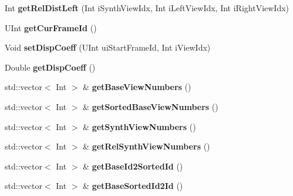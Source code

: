 \begin{DoxyCompactItemize}
\item 
\mbox{\label{class_t_app_com_cam_para_a87cbdc821ef5868ee4a26d709542dd8d}} 
Int {\bfseries get\+Rel\+Dist\+Left} (Int i\+Synth\+View\+Idx, Int i\+Left\+View\+Idx, Int i\+Right\+View\+Idx)
\item 
\mbox{\label{class_t_app_com_cam_para_aac9559fc9c73655d4192c5e58eb53e0a}} 
U\+Int {\bfseries get\+Cur\+Frame\+Id} ()
\item 
\mbox{\label{class_t_app_com_cam_para_a5f01375731e992fedff570a2f5f72142}} 
Void {\bfseries set\+Disp\+Coeff} (U\+Int ui\+Start\+Frame\+Id, Int i\+View\+Idx)
\item 
\mbox{\label{class_t_app_com_cam_para_a63ee097b2c1c12760191fc9ddd0fa855}} 
Double {\bfseries get\+Disp\+Coeff} ()
\item 
\mbox{\label{class_t_app_com_cam_para_a951cea4d21e101346926afbe4f9f1f3e}} 
std\+::vector$<$ Int $>$ \& {\bfseries get\+Base\+View\+Numbers} ()
\item 
\mbox{\label{class_t_app_com_cam_para_ada1de704849945a415e96ed58068bdce}} 
std\+::vector$<$ Int $>$ \& {\bfseries get\+Sorted\+Base\+View\+Numbers} ()
\item 
\mbox{\label{class_t_app_com_cam_para_a99924597fbf074b6b49a322bcd170b95}} 
std\+::vector$<$ Int $>$ \& {\bfseries get\+Synth\+View\+Numbers} ()
\item 
\mbox{\label{class_t_app_com_cam_para_a2ddab02c44c0bb26d97bd5153d86a6c3}} 
std\+::vector$<$ Int $>$ \& {\bfseries get\+Rel\+Synth\+View\+Numbers} ()
\item 
\mbox{\label{class_t_app_com_cam_para_a9da1de054cd908206d9e137bf5a55f23}} 
std\+::vector$<$ Int $>$ \& {\bfseries get\+Base\+Id2\+Sorted\+Id} ()
\item 
\mbox{\label{class_t_app_com_cam_para_a31cfbddcb7f8166762693606a1d5d80c}} 
std\+::vector$<$ Int $>$ \& {\bfseries get\+Base\+Sorted\+Id2\+Id} ()

\end{DoxyCompactItemize}
